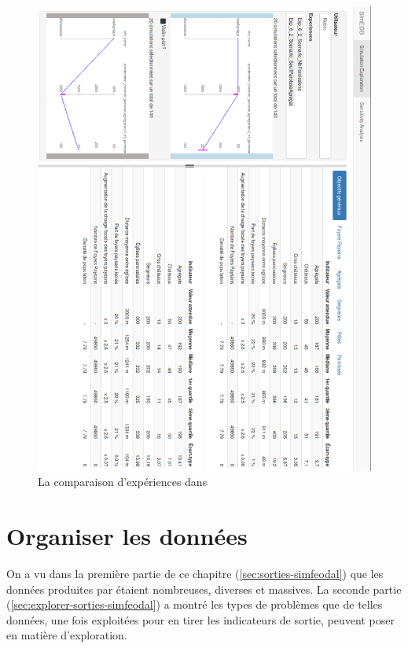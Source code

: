 \begin{figure}[H]
	\centering
	\includegraphics[width=\linewidth]{img/SimEDB_base_rotate.png}
	\caption{La comparaison d'expériences dans \simedb{} }
	\label{fig:simedb_villages}
\end{figure}

\section{Organiser les données}\label{sec:organiser-donnees}

On a vu dans la première partie de ce chapitre (\cref{sec:sorties-simfeodal}) que les données produites par \simfeodal{} étaient nombreuses, diverses et massives.
La seconde partie (\cref{sec:explorer-sorties-simfeodal}) a montré les types de problèmes que de telles données, une fois exploitées pour en tirer les indicateurs de sortie, peuvent poser en matière d'exploration.

